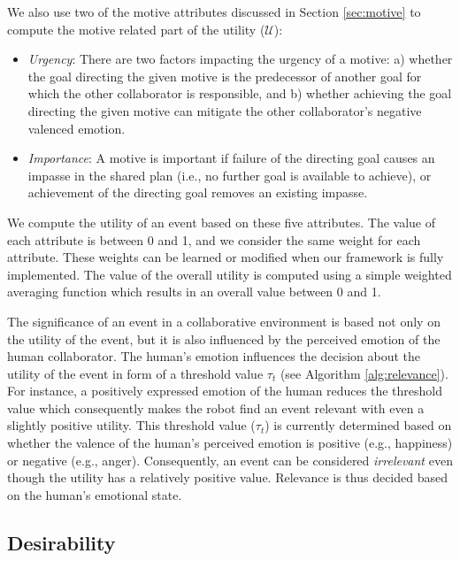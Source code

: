 \documentclass{aamas2016}
\begin{document}
\noindent We also use two of the motive attributes discussed in Section
\ref{sec:motive} to compute the motive related part of the utility
($\mathcal{U}$):

\vspace*{-1mm}
\begin{itemize}[leftmargin=2pt]
  \setlength\itemsep{1mm}
  \item \textit{Urgency}: There are two factors impacting the urgency of
  a motive: a) whether the goal directing the given motive is the predecessor of
  another goal for which the other collaborator is responsible, and b) whether
  achieving the goal directing the given motive can mitigate the other
  collaborator's negative valenced emotion.
  \item \textit{Importance}: A motive is important if failure of the directing
  goal causes an impasse in the shared plan (i.e., no further goal is available
  to achieve), or achievement of the directing goal removes an existing impasse.
\end{itemize}

\vspace*{-1mm}
We compute the utility of an event based on these five attributes. The value of
each attribute is between 0 and 1, and we consider the same weight for each
attribute. These weights can be learned or modified when our framework is fully
implemented. The value of the overall utility is computed using a simple
weighted averaging function which results in an overall value between 0 and 1.

The significance of an event in a collaborative environment is based not
only on the utility of the event, but it is also influenced by the perceived
emotion of the human collaborator. The human's emotion influences the decision
about the utility of the event in form of a threshold value $\tau_{t}$ (see
Algorithm \ref{alg:relevance}). For instance, a positively expressed emotion of
the human reduces the threshold value which consequently makes the robot find an
event relevant with even a slightly positive utility. This threshold value
($\tau_{t}$) is currently determined based on whether the valence of the
human's perceived emotion is positive (e.g., happiness) or negative (e.g.,
anger). Consequently, an event can be considered \textit{irrelevant} even though
the utility has a relatively positive value. Relevance is thus decided based on
the human's emotional state.

\vspace*{-3mm}
\subsection{Desirability}
\end{document}
